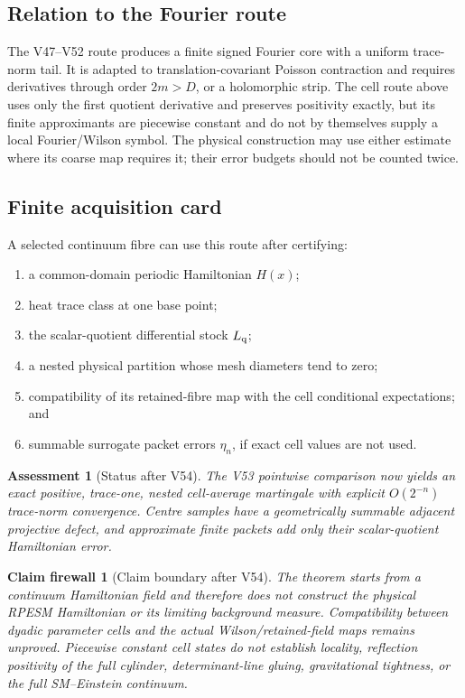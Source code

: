 \documentclass[11pt]{article}
\newtheorem{firewall}[theorem]{Claim firewall}
\newtheorem{assessment}[theorem]{Assessment}
\theoremstyle{remark}
\begin{document}
\subsection{Relation to the Fourier route}

The V47--V52 route produces a finite signed Fourier core with a
uniform trace-norm tail.  It is adapted to translation-covariant
Poisson contraction and requires derivatives through order
\(2m>D\), or a holomorphic strip.  The cell route above uses only the
first quotient derivative and preserves positivity exactly, but its
finite approximants are piecewise constant and do not by themselves
supply a local Fourier/Wilson symbol.  The physical construction may
use either estimate where its coarse map requires it; their error
budgets should not be counted twice.

\subsection{Finite acquisition card}

A selected continuum fibre can use this route after certifying:
\begin{enumerate}
\item a common-domain periodic Hamiltonian \(H(x)\);
\item heat trace class at one base point;
\item the scalar-quotient differential stock \(L_{\rm q}\);
\item a nested physical partition whose mesh diameters tend to zero;
\item compatibility of its retained-fibre map with the cell
conditional expectations; and
\item summable surrogate packet errors \(\eta_n\), if exact cell
values are not used.
\end{enumerate}

\begin{assessment}[Status after V54]
\label{ass:v12v54-status}
The V53 pointwise comparison now yields an exact positive,
trace-one, nested cell-average martingale with explicit
\(O(2^{-n})\) trace-norm convergence.  Centre samples have a
geometrically summable adjacent projective defect, and approximate
finite packets add only their scalar-quotient Hamiltonian error.
\end{assessment}

\begin{firewall}[Claim boundary after V54]
\label{fire:v12v54-claim}
The theorem starts from a continuum Hamiltonian field and therefore
does not construct the physical RPESM Hamiltonian or its limiting
background measure.  Compatibility between dyadic parameter cells
and the actual Wilson/retained-field maps remains unproved.
Piecewise constant cell states do not establish locality,
reflection positivity of the full cylinder, determinant-line
gluing, gravitational tightness, or the full SM--Einstein
continuum.
\end{firewall}
\end{document}
